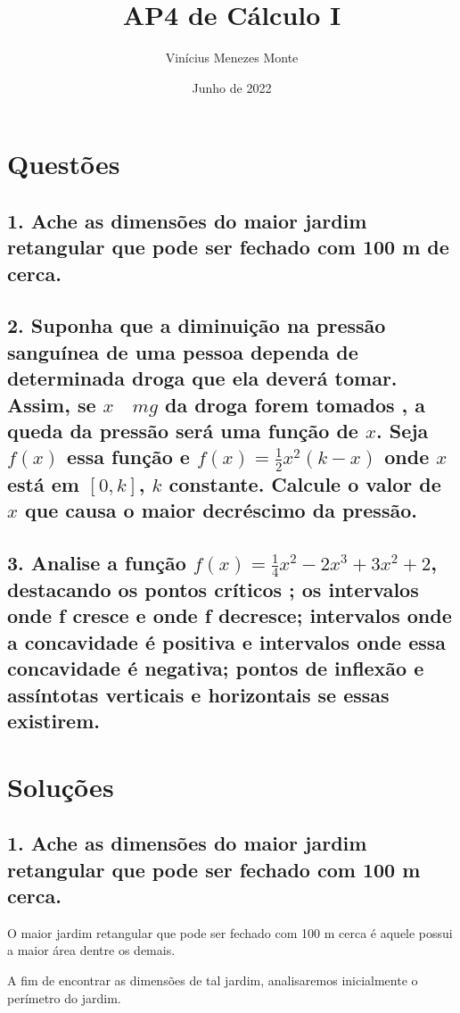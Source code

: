\documentclass{article}
\title{AP4 de Cálculo I}
\author{Vinícius Menezes Monte}
\date{Junho de 2022}
\begin{document}
\maketitle

\section*{Questões}

\subsection*{1. Ache as dimensões do maior jardim retangular que pode ser
    fechado com 100 m de cerca.}

\subsection*{2. Suponha que a diminuição na pressão sanguínea de uma pessoa
    dependa de determinada droga que ela deverá tomar. Assim, se \(x \quad mg\) da
    droga forem tomados , a queda da pressão será uma função de \(x\).
    Seja \(f(x)\) essa função e \(f(x) = \frac{1}{2}x^2(k-x)\) onde \(x\) está
    em \([0,k]\), \(k\) constante.
    Calcule o valor de \(x\) que causa o maior decréscimo da pressão.}

\subsection*{3. Analise a função \(f(x) = \frac{1}{4}x^2-2x^3+3x^2+2\), destacando os
    pontos críticos ; os intervalos onde f cresce e onde f decresce; intervalos
    onde a concavidade é positiva e intervalos onde essa concavidade é
    negativa; pontos de inflexão e assíntotas verticais e horizontais se
    essas existirem.}

\section*{Soluções}

\subsection*{1. Ache as dimensões do maior jardim retangular que pode ser
    fechado com 100 m cerca.}

O maior jardim retangular que pode ser fechado com 100 m cerca é
aquele possui a maior área dentre os demais.

A fim de encontrar as dimensões de tal jardim, analisaremos inicialmente
o perímetro do jardim.
\end{document}
